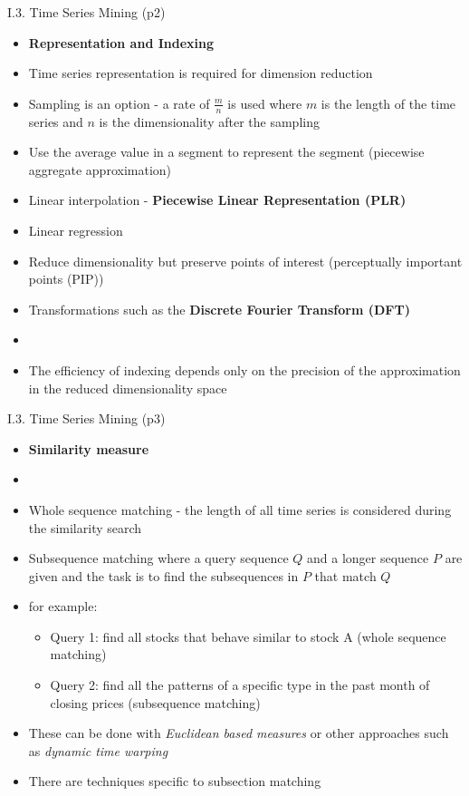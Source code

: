 \documentclass[handout]{beamer}
\newcommand{\strong}[1]{\textbf{\color{teal} #1}}
\newcommand{\stronger}[1]{\textbf{\color{purple} #1}}
\begin{document}
\begin{frame}{I.3. Time Series Mining (p2)}
\begin{itemize}
\item[] \stronger{Representation and Indexing}
\item Time series representation is required for dimension reduction
\item Sampling is an option - a rate of $\frac{m}{n}$ is used where $m$ is the length of the time series and $n$ is the dimensionality after the sampling
\item Use the average value in a segment to represent the segment (piecewise aggregate approximation)
\item Linear interpolation - \strong{Piecewise Linear Representation (PLR)}
\item Linear regression
\item Reduce dimensionality but preserve points of interest (perceptually important points (PIP))
\item Transformations such as the \strong{Discrete Fourier Transform (DFT)}
\item[]
\item The efficiency of indexing depends only on the precision of the approximation in the reduced dimensionality space
\end{itemize}
\end{frame}
\begin{frame}{I.3. Time Series Mining (p3)}
\begin{itemize}
\item[] \stronger{Similarity measure}
\item[]
\item Whole sequence matching - the length of all time series is considered during the similarity search
\item Subsequence matching where a query sequence $Q$ and a longer sequence $P$ are given and the task is to find the subsequences in $P$ that match $Q$
\item for example:
	\begin{itemize}
	\item Query 1: find all stocks that behave similar to stock A (whole sequence matching)
	\item Query 2: find all the patterns of a specific type in the past month of closing prices (subsequence matching)
	\end{itemize}
\item These can be done with \emph{Euclidean based measures} or other approaches such as \emph{dynamic time warping}
\item There are techniques specific to subsection matching
\end{itemize}
\end{frame}
\end{document}

